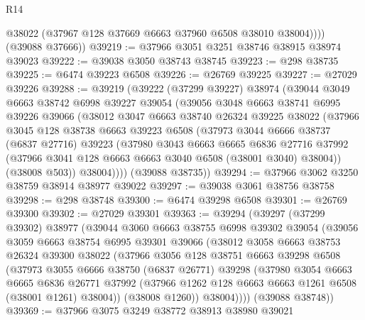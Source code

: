 \begin{lexlean}{R14}
\begin{coremodule}
            @38022
            (@37967 @128 @37669 @6663 @37960 @6508 @38010 @38004))))
      (@39088 @37666))
@39219 := @37966 @3051 @3251 @38746 @38915 @38974 @39023
@39222 := @39038 @3050 @38743 @38745
@39223 := @298 @38735
@39225 := @6474 @39223 @6508
@39226 := @26769 @39225
@39227 := @27029 @39226
@39288 := @39219
    (@39222
      (@37299 @39227)
      @38974
      (@39044
        @3049
        @6663
        @38742
        @6998
        @39227
        @39054
        (@39056
          @3048
          @6663
          @38741
          @6995
          @39226
          @39066
          (@38012
            @3047
            @6663
            @38740
            @26324
            @39225
            @38022
            (@37966
              @3045
              @128
              @38738
              @6663
              @39223
              @6508
              (@37973
                @3044
                @6666
                @38737
                (@6837 @27716)
                @39223
                (@37980
                  @3043
                  @6663
                  @6665
                  @6836
                  @27716
                  @37992
                  (@37966 @3041 @128 @6663 @6663 @3040 @6508 (@38001 @3040) @38004))
                (@38008 @503))
              @38004))))
      (@39088 @38735))
@39294 := @37966 @3062 @3250 @38759 @38914 @38977 @39022
@39297 := @39038 @3061 @38756 @38758
@39298 := @298 @38748
@39300 := @6474 @39298 @6508
@39301 := @26769 @39300
@39302 := @27029 @39301
@39363 := @39294
    (@39297
      (@37299 @39302)
      @38977
      (@39044
        @3060
        @6663
        @38755
        @6998
        @39302
        @39054
        (@39056
          @3059
          @6663
          @38754
          @6995
          @39301
          @39066
          (@38012
            @3058
            @6663
            @38753
            @26324
            @39300
            @38022
            (@37966
              @3056
              @128
              @38751
              @6663
              @39298
              @6508
              (@37973
                @3055
                @6666
                @38750
                (@6837 @26771)
                @39298
                (@37980
                  @3054
                  @6663
                  @6665
                  @6836
                  @26771
                  @37992
                  (@37966 @1262 @128 @6663 @6663 @1261 @6508 (@38001 @1261) @38004))
                (@38008 @1260))
              @38004))))
      (@39088 @38748))
@39369 := @37966 @3075 @3249 @38772 @38913 @38980 @39021

\end{coremodule}
\end{lexlean}

